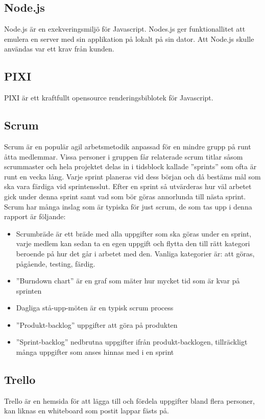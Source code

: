 \subsection*{Node.js}
Node.js är en exekveringsmiljö för Javascript. Nodes.js ger funktionallitet att emulera en server med sin applikation på lokalt på sin dator. Att Node.js skulle användas var ett krav från kunden.

\subsection*{PIXI}
PIXI är ett kraftfullt opensource renderingsbiblotek för Javascript.

\subsection*{Scrum}
Scrum är en populär agil arbetsmetodik anpassad för en mindre grupp på runt åtta medlemmar. Vissa personer i gruppen får relaterade scrum titlar såsom scrummaster och hela projektet delas in i tidsblock kallade ''sprints'' som ofta är runt en vecka lång. Varje sprint planeras vid dess början och då bestäms mål som ska vara färdiga vid sprintensslut. Efter en sprint så utvärderas hur väl arbetet gick under denna sprint samt vad som bör göras annorlunda till nästa sprint. Scrum har många inslag som är typiska för just scrum, de som tas upp i denna rapport är följande:

\begin{itemize}
	\item Scrumbräde är ett bräde med alla uppgifter som ska göras under en sprint, varje medlem kan sedan ta en egen uppgift och flytta den till rätt kategori beroende på hur det går i arbetet med den. Vanliga kategorier är: att göras, pågående, testing, färdig.
	\item ''Burndown chart'' är en graf som mäter hur mycket tid som är kvar på sprinten
	\item Dagliga stå-upp-möten är en typisk scrum process
	\item ''Produkt-backlog'' uppgifter att göra på produkten
	\item ''Sprint-backlog'' nedbrutna uppgifter ifrån produkt-backlogen, tillräckligt många uppgifter som anses hinnas med i en sprint
\end{itemize}

\subsection*{Trello}
Trello är en hemsida för att lägga till och fördela uppgifter bland flera personer, kan liknas en whiteboard som postit lappar fästs på.


